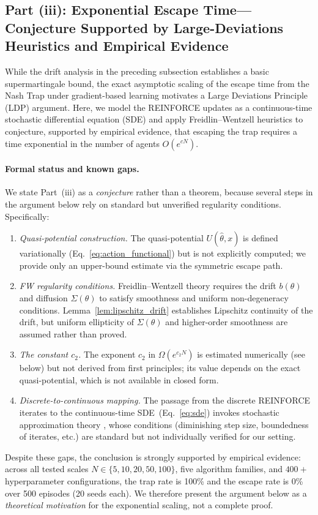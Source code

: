 \subsection{Part (iii): Exponential Escape Time---Conjecture Supported by Large-Deviations Heuristics and Empirical Evidence}

While the drift analysis in the preceding subsection establishes a basic supermartingale bound, the exact asymptotic scaling of the escape time from the Nash Trap under gradient-based learning motivates a Large Deviations Principle (LDP) argument. Here, we model the REINFORCE updates as a continuous-time stochastic differential equation (SDE) and apply Freidlin--Wentzell heuristics to conjecture, supported by empirical evidence, that escaping the trap requires a time exponential in the number of agents $O(e^{cN})$.

\paragraph{Formal status and known gaps.}
We state Part~(iii) as a \emph{conjecture} rather than a theorem, because several steps in the argument below rely on standard but unverified regularity conditions. Specifically:
\begin{enumerate}[leftmargin=*,topsep=2pt,itemsep=1pt]
\item \emph{Quasi-potential construction.} The quasi-potential $U(\hat\theta,x)$ is defined variationally (Eq.~\ref{eq:action_functional}) but is not explicitly computed; we provide only an upper-bound estimate via the symmetric escape path.
\item \emph{FW regularity conditions.} Freidlin--Wentzell theory requires the drift $b(\theta)$ and diffusion $\Sigma(\theta)$ to satisfy smoothness and uniform non-degeneracy conditions. Lemma~\ref{lem:lipschitz_drift} establishes Lipschitz continuity of the drift, but uniform ellipticity of $\Sigma(\theta)$ and higher-order smoothness are assumed rather than proved.
\item \emph{The constant $c_2$.} The exponent $c_2$ in $\Omega(e^{c_2 N})$ is estimated numerically (see below) but not derived from first principles; its value depends on the exact quasi-potential, which is not available in closed form.
\item \emph{Discrete-to-continuous mapping.} The passage from the discrete REINFORCE iterates to the continuous-time SDE~(Eq.~\ref{eq:sde}) invokes stochastic approximation theory \citep{kushner2003stochastic, borkar2009stochastic}, whose conditions (diminishing step size, boundedness of iterates, etc.) are standard but not individually verified for our setting.
\end{enumerate}
Despite these gaps, the conclusion is strongly supported by empirical evidence: across all tested scales $N \in \{5, 10, 20, 50, 100\}$, five algorithm families, and $400{+}$ hyperparameter configurations, the trap rate is 100\% and the escape rate is 0\% over 500 episodes (20 seeds each). We therefore present the argument below as a \emph{theoretical motivation} for the exponential scaling, not a complete proof.

